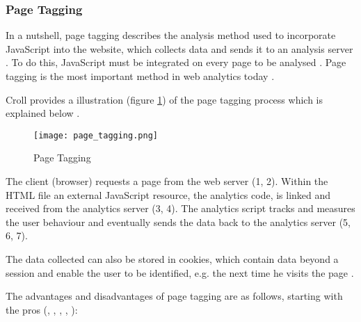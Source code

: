 

\subsubsection{Page Tagging}
\label{chapter:page_tagging}


In a nutshell, page tagging describes the analysis method used to incorporate JavaScript into the website, which collects data and sends it to an analysis server \cite{2011Marek}.
To do this, JavaScript must be integrated on every page to be analysed \cite{2009Waisberg}.
Page tagging is the most important method in web analytics today \cite{2015Zheng}.


Croll provides a illustration (figure \ref{img:page_tagging}) of the page tagging process which is explained below \cite{2009Croll}.

\begin{figure}[h!]
\begin{center}
\texttt{[image: page\_tagging.png]}
\caption{Page Tagging}
\label{img:page_tagging}
\end{center}
\end{figure}

The client (browser) requests a page from the web server (1, 2).
Within the HTML file an external JavaScript resource, the analytics code, is linked and received from the analytics server (3, 4).
The analytics script tracks and measures the user behaviour and eventually sends the data back to the analytics server (5, 6, 7).

The data collected can also be stored in cookies, which contain data beyond a session and enable the user to be identified, e.g. the next time he visits the page \cite{2019Kumar}.


The advantages and disadvantages of page tagging are as follows, starting with the pros (\cite{2009Waisberg}, \cite{2011Nakatani}, \cite{2011Marek}, \cite{2014Singal}, \cite{2015Zheng}):


